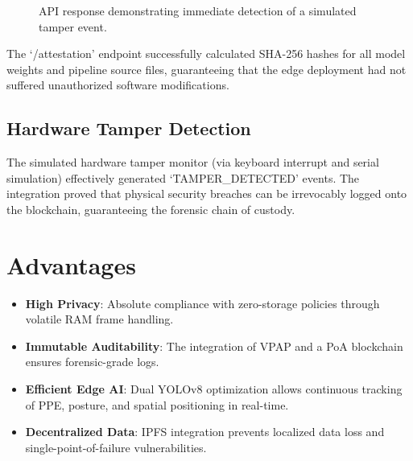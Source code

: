 \documentclass[conference]{IEEEtran}
\begin{document}
\begin{figure}[htbp]
  \centering
  \caption{API response demonstrating immediate detection of a simulated tamper event.}
  \label{fig:tamper_output}
\end{figure}

The `/attestation' endpoint successfully calculated SHA-256 hashes for all model weights and pipeline source files, guaranteeing that the edge deployment had not suffered unauthorized software modifications. 

\subsection{Hardware Tamper Detection}
The simulated hardware tamper monitor (via keyboard interrupt and serial simulation) effectively generated `TAMPER\_DETECTED' events. The integration proved that physical security breaches can be irrevocably logged onto the blockchain, guaranteeing the forensic chain of custody.

\section{Advantages}
\begin{itemize}
    \item \textbf{High Privacy}: Absolute compliance with zero-storage policies through volatile RAM frame handling.
    \item \textbf{Immutable Auditability}: The integration of VPAP and a PoA blockchain ensures forensic-grade logs.
    \item \textbf{Efficient Edge AI}: Dual YOLOv8 optimization allows continuous tracking of PPE, posture, and spatial positioning in real-time.
    \item \textbf{Decentralized Data}: IPFS integration prevents localized data loss and single-point-of-failure vulnerabilities.
\end{itemize}
\end{document}
